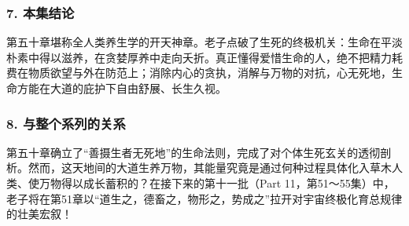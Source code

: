 \subsubsection{7. 本集结论}
第五十章堪称全人类养生学的开天神章。老子点破了生死的终极机关：生命在平淡朴素中得以滋养，在贪婪厚养中走向夭折。真正懂得爱惜生命的人，绝不把精力耗费在物质欲望与外在防范上；消除内心的贪执，消解与万物的对抗，心无死地，生命方能在大道的庇护下自由舒展、长生久视。

\subsubsection{8. 与整个系列的关系}
第五十章确立了“善摄生者无死地”的生命法则，完成了对个体生死玄关的透彻剖析。然而，这天地间的大道生养万物，其能量究竟是通过何种过程具体化入草木人类、使万物得以成长蓄积的？在接下来的第十一批（Part 11，第51～55集）中，老子将在第51章以“道生之，德畜之，物形之，势成之”拉开对宇宙终极化育总规律的壮美宏叙！